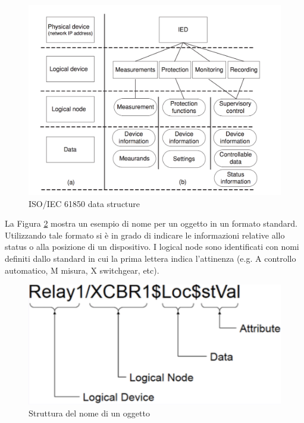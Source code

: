 \begin{figure}[h]
	\centering
	\includegraphics[scale=0.350]{imgs/iec61850ds.png}
	\caption{ISO/IEC 61850 data structure} \label{fig:iec61850ds}
\end{figure}\newpage
La Figura \ref{fig:name_obj} mostra un esempio di nome per un oggetto in un formato standard. Utilizzando tale formato si è in grado di indicare le informazioni relative allo status o alla posizione di un dispositivo. I logical node sono identificati con nomi definiti dallo standard in cui la prima lettera indica l'attinenza (e.g. A controllo automatico, M misura, X switchgear, etc).
\begin{figure}[h]
	\centering
	\includegraphics[scale=0.350]{imgs/name_obj.png}
	\caption{Struttura del nome di un oggetto} \label{fig:name_obj}
\end{figure}
\newline
